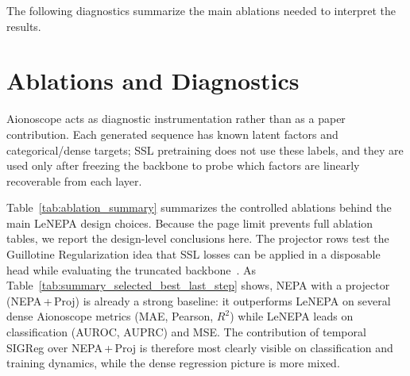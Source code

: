 \documentclass[sigconf,anonymous,review]{acmart}
\begin{document}
The following diagnostics summarize the main ablations needed to interpret the results.

\section{Ablations and Diagnostics}
\label{sec:ablations_diagnostics}

Aionoscope acts as diagnostic instrumentation rather than as a paper contribution.
Each generated sequence has known latent factors and categorical/dense targets; SSL pretraining does not use these labels, and they are used only after freezing the backbone to probe which factors are linearly recoverable from each layer.

Table~\ref{tab:ablation_summary} summarizes the controlled ablations behind the main LeNEPA design choices.
Because the page limit prevents full ablation tables, we report the design-level conclusions here.
The projector rows test the Guillotine Regularization idea that SSL losses can be applied in a disposable head while evaluating the truncated backbone~\citep{bordes2022guillotine}.
As Table~\ref{tab:summary_selected_best_last_step} shows, NEPA with a projector (NEPA\,+\,Proj) is already a strong baseline: it outperforms LeNEPA on several dense Aionoscope metrics (MAE, Pearson, $R^2$) while LeNEPA leads on classification (AUROC, AUPRC) and MSE.
The contribution of temporal SIGReg over NEPA\,+\,Proj is therefore most clearly visible on classification and training dynamics, while the dense regression picture is more mixed.
\end{document}
